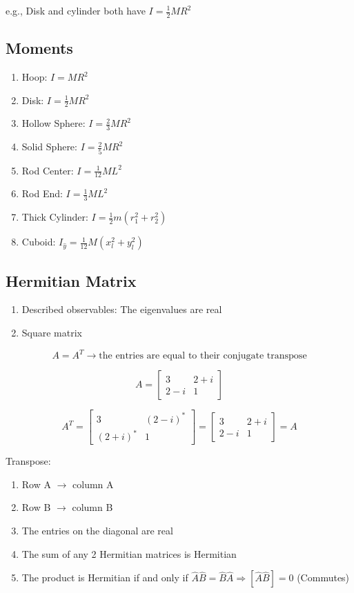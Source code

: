 \documentclass[10pt,a4paper]{article}
\begin{document}
e.g., Disk and cylinder both have $I=\frac{1}{2}MR^2$

\subsection{Moments}
\begin{enumerate}
    \item Hoop: $I=MR^2$
    \item Disk: $I=\frac{1}{2}MR^2$
    \item Hollow Sphere: $I = \frac{2}{3}MR^2$
    \item Solid Sphere: $I=\frac{2}{5}MR^2$
    \item Rod Center: $I=\frac{1}{12}ML^2$
    \item Rod End: $I=\frac{1}{3}ML^2$
    \item Thick Cylinder: $I=\frac{1}{2}m(r^2_1 + r^2_2)$
    \item Cuboid: $I_{\hat{y}} = \frac{1}{12}M(x^2_l + y^2_l)$
\end{enumerate}

\subsection{Hermitian Matrix}
\begin{enumerate}
    \item Described observables: The eigenvalues are real
    \item Square matrix
\end{enumerate}
\begin{equation}
 A = A^T \rightarrow \textrm{the entries are equal to their conjugate transpose}
\end{equation}

\[A= \left[ \begin{array}{cc}
3 & 2+i  \\
2-i & 1  \end{array} \right]\]

\[A^T= \left[ \begin{array}{cc}
3 & (2-i)^*  \\
(2+i)^* & 1  \end{array} \right] = 
\left[ \begin{array}{cc}
3 & 2+i  \\
2-i & 1  \end{array} \right] = A\]

Transpose: 
\begin{enumerate}
    \item Row A $\rightarrow$ column A
    \item Row B $\rightarrow$ column B
    \item The entries on the diagonal are real
    \item The sum of any 2 Hermitian matrices is Hermitian
    \item The product is Hermitian if and only if $\hat{A}\hat{B} = \hat{B}\hat{A}\Rightarrow [\hat{A}\hat{B}]=0$ (Commutes)
\end{enumerate}
\end{document}
